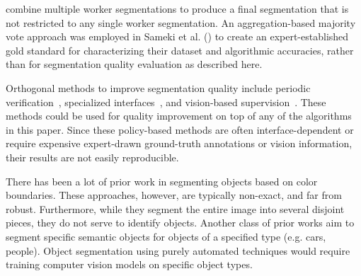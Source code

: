 combine multiple worker segmentations to produce a final segmentation that is not restricted to any single worker segmentation. An aggregation-based majority vote approach was employed in Sameki et al. (\citeyear{Sameki2015}) to create an expert-established gold standard for characterizing their dataset and algorithmic accuracies, rather than for segmentation quality evaluation as described here.

\par Orthogonal methods to improve segmentation quality include periodic verification~\cite{Lin2014,Everingham15}, specialized interfaces~\cite{Song2018}, and vision-based supervision~\cite{Russakovsky2015,Gurari2016}. These methods could be used for quality improvement on top of any of the algorithms in this paper.  Since these policy-based methods are often interface-dependent or require expensive expert-drawn ground-truth annotations or vision information, their results are not easily reproducible. %

 There has been a lot of prior work in segmenting objects based on color boundaries\cite{felzenszwalb2004efficient,Y.Y.Boykov2001}. These approaches, however, are typically non-exact, and far from robust. Furthermore, while they segment the entire image into several disjoint pieces, they do not serve to identify objects. Another class of prior works aim to segment specific semantic objects for objects of a specified type (e.g. cars, people)\cite{AdrianaKovashka2016,Lin2014,zhou2017scene}. Object segmentation using purely automated techniques would require training computer vision models on specific object types. 